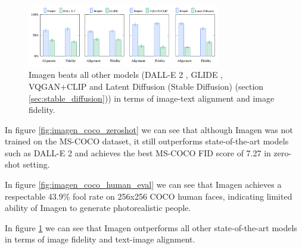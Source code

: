 \begin{figure}
    \centering
    \includegraphics[width=0.75\textwidth]{images/imagen/alignment_fidelity_imagen_vs_models.png}
    \caption{Imagen beats all other models (DALL-E 2 \cite{dalle_2}, GLIDE \cite{glide}, VQGAN+CLIP \cite{vqgan_clip} and Latent Diffusion (Stable Diffusion) \cite{stable_diffusion} (section \ref{sec:stable_diffusion})) in terms of image-text alignment and image fidelity.}
    \label{fig:imagen_alignment_fidelity_vs_other_models}
\end{figure}

In figure \ref{fig:imagen_coco_zeroshot} we can see that although Imagen was not trained on the MS-COCO dataset, it still outperforms state-of-the-art models such as DALL-E 2 \cite{dalle_2} and achieves the best MS-COCO FID score of 7.27 in zero-shot setting.

In figure \ref{fig:imagen_coco_human_eval} we can see that Imagen achieves a respectable 43.9\% fool rate on 256x256 COCO human faces, indicating limited ability of Imagen to generate photorealistic people.

In figure \ref{fig:imagen_alignment_fidelity_vs_other_models} we can see that Imagen outperforms all other state-of-the-art models in terms of image fidelity and text-image alignment.
